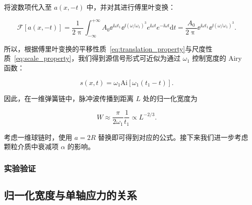 将波数项代入至 $a(x,-t)$ 中，并对其进行傅里叶变换：

\begin{equation}
  \mathcal{F}[a(x,-t)] = \frac{1}{2\uppi}\int_{-\infty}^{+\infty}A_{0}{\ee}^{\ii\omega t_{1}}{\ee}^{\ii(\omega/\omega_{1})^{3}}e^{\ii\omega t}e^{-\ii\omega t}\mathrm{d}t = \frac{A_{0}}{2\uppi}{\ee}^{\ii\omega t_{1}}{\ee}^{\ii(\omega/\omega_{1})^{3}}.
\end{equation}

所以，根据傅里叶变换的平移性质~\eqref{eq:translation_property}与尺度性质~\eqref{eq:scale_property}，我们得到源信号形式可近似为通过 $\omega_{1}$ 控制宽度的 Airy 函数：

\begin{equation}
  s(x,t) = \omega_{1}\text{Ai}\left[\omega_{1}(t_{1}-t)\right].
\end{equation}

因此，在一维弹簧链中，脉冲波传播到距离 $L$ 处的归一化宽度为

\begin{equation}
  W \approx \frac{\pi}{2\omega_{1}}\frac{1}{t_{1}}\propto L^{-2/3}.
\end{equation}

考虑一维球链时，使用 $a=2R$ 替换即可得到对应的公式\cite{PhysRevE.91.022205}。接下来我们进一步考虑颗粒介质中衰减项 $\alpha$ 的影响。

\subsubsection{实验验证}

\subsection{归一化宽度与单轴应力的关系}
